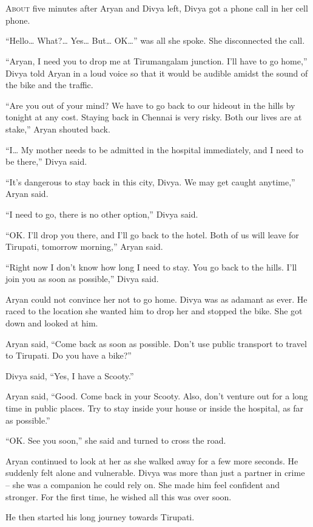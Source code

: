 \chapter{}

\lettrine{A}{bout} five minutes after Aryan and Divya left, Divya got a phone call in her
cell phone.

“Hello… What?… Yes… But… OK…” was all she spoke. She
disconnected the call.

“Aryan, I need you to drop me at Tirumangalam junction. I'll have to go home,”
Divya told Aryan in a loud voice so that it would be audible amidst the sound of
the bike and the traffic.

“Are you out of your mind? We have to go back to our hideout in the hills by
tonight at any cost. Staying back in Chennai is very risky. Both our lives are
at stake,” Aryan shouted back.

“I… My mother needs to be admitted in the hospital immediately, and I need
to be there,” Divya said.

“It's dangerous to stay back in this city, Divya. We may get caught anytime,”
Aryan said.

“I need to go, there is no other option,” Divya said.

“OK. I'll drop you there, and I'll go back to the hotel. Both of us will leave for
Tirupati, tomorrow morning,” Aryan said.

“Right now I don't know how long I need to stay. You go back to the hills. I'll
join you as soon as possible,” Divya said.

Aryan could not convince her not to go home. Divya was as adamant as ever. He
raced to the location she wanted him to drop her and stopped the bike. She got
down and looked at him.

Aryan said, “Come back as soon as possible. Don't use public transport to travel
to Tirupati. Do you have a bike?”

Divya said, “Yes, I have a Scooty.”

Aryan said, “Good. Come back in your Scooty. Also, don't venture out for a long
time in public places. Try to stay inside your house or inside the hospital, as
far as possible.”

“OK. See you soon,” she said and turned to cross the road.

Aryan continued to look at her as she walked away for a few more seconds. He
suddenly felt alone and vulnerable. Divya was more than just a partner in crime
– she was a companion he could rely on. She made him feel confident and
stronger. For the first time, he wished all this was over soon.

He then started his long journey towards Tirupati.